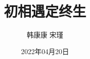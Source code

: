 \documentclass[a4paper]{book}
\begin{document}
    \pagestyle{empty}
    \title{初相遇定终生}
    \author{韩康康 宋瑾}
    \date{2022年04月20日}
    \maketitle

    
    \listoftodos %
    \tableofcontents %

    
    
    
    

    
    
    
\listoffigures
\listoftables
\printindex
\end{document}
